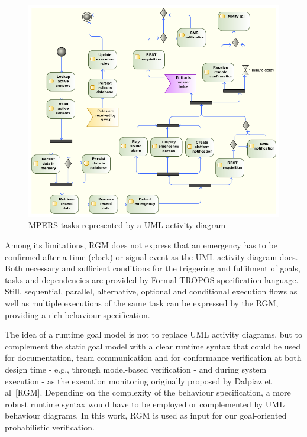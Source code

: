 \begin{figure}[h!]
\centering
\includegraphics[width=1\textwidth]{imgs/MPERS_UMLAD.png}
\caption{MPERS tasks represented by a UML activity diagram}
\label{fig:MPERS_UMLAD}
\end{figure}

Among its limitations, RGM does not express that an emergency has to be confirmed after a time (clock) or signal event as the UML activity diagram does. Both necessary and sufficient conditions for the triggering and fulfilment of goals, tasks and dependencies are provided by Formal TROPOS specification language.  Still, sequential, parallel, alternative, optional and conditional execution flows as well as multiple executions of the same task can be expressed by the RGM, providing a rich behaviour specification.


The idea of a runtime goal model is not to replace UML activity diagrams, but to complement the static goal model with a clear runtime syntax that could be used for 
documentation, team communication and for conformance verification at both design time - e.g., through model-based verification - and during system execution - as the execution monitoring originally proposed by Dalpiaz et al~[RGM]. Depending on the complexity of the behaviour specification, a more robust runtime syntax would have to be employed or complemented by UML behaviour diagrams. In this work, RGM is used as input for our goal-oriented probabilistic verification.

